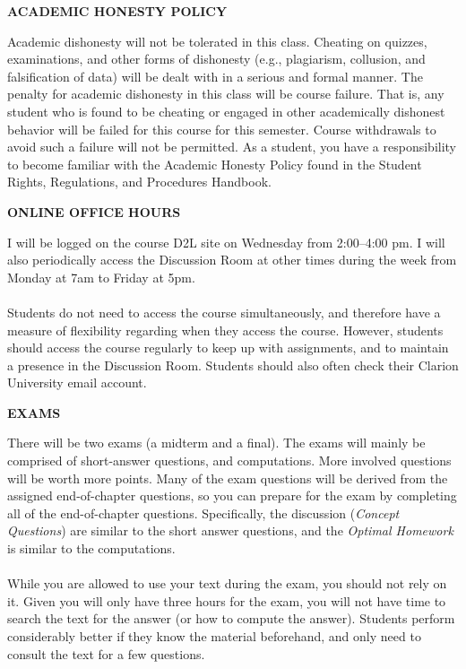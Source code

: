 \documentclass{article}
\begin{document}
\begin{center}
{\bf ACADEMIC HONESTY POLICY}
\end{center} 
Academic dishonesty will not be tolerated in this class. Cheating
on quizzes, examinations, and other forms of dishonesty (e.g., plagiarism, collusion, and
falsification of data) will be dealt with in a serious and formal manner. The penalty for academic
dishonesty in this class will be course failure. That is, any student who is found to be cheating
or engaged in other academically dishonest behavior will be failed for this course for this
semester. Course withdrawals to avoid such a failure will not be permitted. As a student, you
have a responsibility to become familiar with the Academic Honesty Policy found in the Student
Rights, Regulations, and Procedures Handbook.\\
\begin{center}
{\bf ONLINE OFFICE HOURS}  
\end{center}
I will be logged on the course D2L site on Wednesday from 2:00--4:00 pm. I will also periodically access the Discussion Room at other times during the week from Monday at 7am to Friday at 5pm.\\
\\
Students do not need to access the course simultaneously, and therefore have a measure of flexibility regarding when they access the course.  However, students should access the course regularly to keep up with assignments, and to maintain a presence in the Discussion Room.  Students should also often check their Clarion University email account.\\ 
\begin{center}
{\bf EXAMS}
\end{center} 
There will be two exams (a midterm and a final). The exams will mainly be comprised of short-answer questions, and computations.  More involved questions will be worth more points.  Many of the exam questions will be derived from the assigned end-of-chapter questions, so you can prepare for the exam by completing all of the end-of-chapter questions.  Specifically, the discussion ({\it Concept Questions}\/) are similar to the short answer questions, and the {\it Optimal Homework\/} is similar to the computations. \\
\\
While you are allowed to use your text during the exam, you should not rely on it.  Given you will only have three hours for the exam, you will not have time to search the text for the answer (or how to compute the answer).  Students perform considerably better if they know the material beforehand, and only need to consult the text for a few questions.  \\
\end{document}
